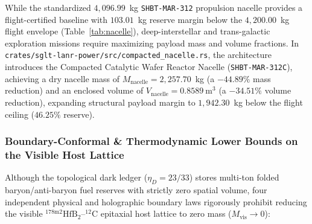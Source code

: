 \documentclass[11pt,onecolumn]{article}
\begin{document}
While the standardized $4{,}096.99$~kg \texttt{SHBT-MAR-312} propulsion nacelle provides a flight-certified baseline with $103.01$~kg reserve margin below the $4{,}200.00$~kg flight envelope (Table~\ref{tab:nacelle}), deep-interstellar and trans-galactic exploration missions require maximizing payload mass and volume fractions. In \texttt{crates/sglt-lanr-power/src/compacted\_nacelle.rs}, the architecture introduces the Compacted Catalytic Wafer Reactor Nacelle (\texttt{SHBT-MAR-312C}), achieving a dry nacelle mass of $M_{\mathrm{nacelle}} = 2{,}257.70$~kg (a $-44.89\%$ mass reduction) and an enclosed volume of $V_{\mathrm{nacelle}} = 0.8589~\mathrm{m}^3$ (a $-34.51\%$ volume reduction), expanding structural payload margin to $1{,}942.30$~kg below the flight ceiling ($46.25\%$ reserve).

\subsubsection{Boundary-Conformal \& Thermodynamic Lower Bounds on the Visible Host Lattice}
Although the topological dark ledger ($\eta_D = 23/33$) stores multi-ton folded baryon/anti-baryon fuel reserves with strictly zero spatial volume, four independent physical and holographic boundary laws rigorously prohibit reducing the visible $^{178\mathrm{m2}}\mathrm{HfB}_2\text{--}^{12}\mathrm{C}$ epitaxial host lattice to zero mass ($M_{\mathrm{vis}} \to 0$):
\end{document}
